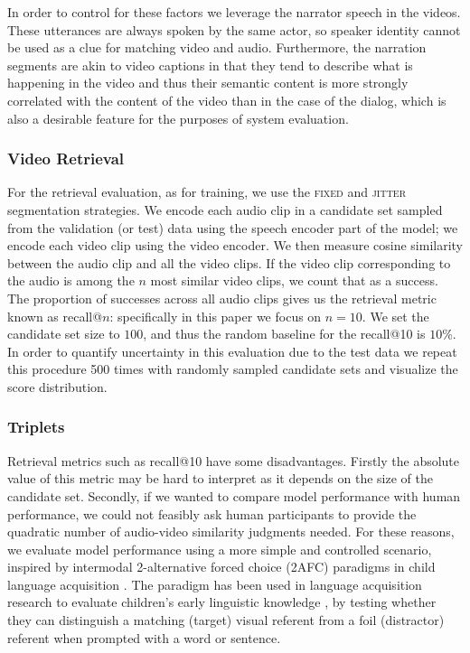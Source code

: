 In order to control for these factors we leverage the
narrator speech in the videos. These utterances are always spoken by
the same actor, so speaker identity cannot be used as a clue for
matching video and audio. Furthermore, the narration segments are akin
to video captions in that they tend to describe what is happening in
the video and thus their semantic content is more strongly
correlated with the content of the video than in the case of the
dialog, which is also a desirable feature for the purposes of system
evaluation.

\subsubsection{Video Retrieval}
\label{sec:retrieval}
For the retrieval evaluation, as for training, we use the
\textsc{fixed} and \textsc{jitter} segmentation strategies. We encode
each audio clip in a candidate set sampled from the validation (or
test) data using the speech encoder part of the model; we encode each
video clip using the video encoder. We then measure cosine similarity
between the audio clip and all the video clips. If the video clip
corresponding to the audio is among the $n$ most similar video clips,
we count that as a success. The proportion of successes across all
audio clips gives us the retrieval metric known as recall@$n$:
specifically in this paper we focus on $n=10$. We set the candidate
set size to $100$, and thus the random baseline for the recall@10 is
$10$\%. In order to quantify uncertainty in this evaluation due to the
test data we repeat this procedure 500 times with randomly sampled
candidate sets and visualize the score distribution.  


\subsubsection{Triplets}
\label{sec:triplets}
Retrieval metrics such as recall@10 have some disadvantages. Firstly
the absolute value of this metric may be hard to interpret as it depends
on the size of the candidate set. Secondly, if
we wanted to compare model performance with human performance, we
could not feasibly ask human participants to provide the quadratic
number of audio-video similarity judgments needed. For these reasons,
we evaluate model performance using a more simple and controlled scenario, 
inspired by intermodal 2-alternative forced choice (2AFC) paradigms in child
language acquisition \citep{hirsh1996intermodal}.
The paradigm has been used in language acquisition research to
evaluate children's early linguistic knowledge
\citep[e.g.,][]{noble2011comprehension,bergelson20126}, by testing
whether they can distinguish a matching (target) visual referent from
a foil (distractor) referent when prompted with a word or
sentence.

